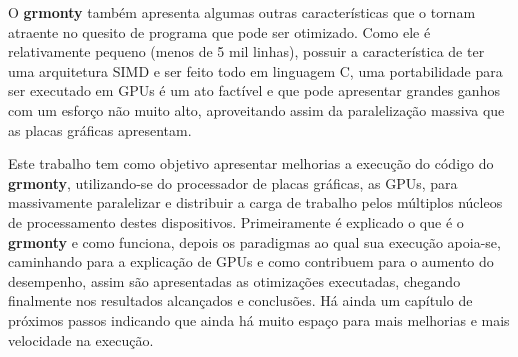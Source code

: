 O \textbf{grmonty} também apresenta algumas outras características que o tornam atraente no quesito de programa que pode ser otimizado. Como ele é relativamente pequeno (menos de 5 mil linhas), possuir a característica de ter uma arquitetura SIMD e ser feito todo em linguagem C, uma portabilidade para ser executado em GPUs é um ato factível e que pode apresentar grandes ganhos com um esforço não muito alto, aproveitando assim da paralelização massiva que as placas gráficas apresentam.

Este trabalho tem como objetivo apresentar melhorias a execução do código do \textbf{grmonty}, utilizando-se do processador de placas gráficas, as GPUs, para massivamente paralelizar e distribuir a carga de trabalho pelos múltiplos núcleos de processamento destes dispositivos. Primeiramente é explicado o que é o \textbf{grmonty} e como funciona, depois os paradigmas ao qual sua execução apoia-se, caminhando para a explicação de GPUs e como contribuem para o aumento do desempenho, assim são apresentadas as otimizações executadas, chegando finalmente nos resultados alcançados e conclusões. Há ainda um capítulo de próximos passos indicando que ainda há muito espaço para mais melhorias e mais velocidade na execução.

%
%
%
%
%
%
%
%
